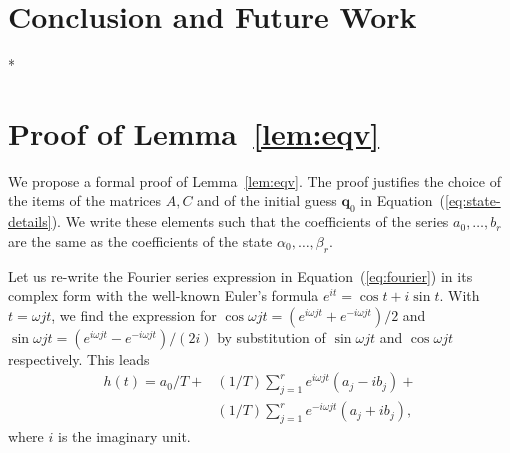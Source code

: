 \documentclass[letterpaper,10pt,conference]{ieeeconf}
\newcommand{\figpath}{./figures}
\theoremstyle{definition}
\begin{document}
%  

%  


\section{Conclusion and Future Work}
\label{sec:conclusion}

*


\balance

 

\leavevmode\thispagestyle{empty}\newpage
\nobalance

\appendices

\section{Proof of Lemma~\ref{lem:eqv}}
\label{app:proof-eqv}

We propose a formal proof of Lemma~\ref{lem:eqv}. The proof justifies the choice of the items of the matrices $A,C$ and of the initial guess $\mathbf{q}_0$ in Equation~(\ref{eq:state-details}). We write these elements such that the coefficients of the series $a_0,\dots,b_r$ are the same as the coefficients of the state $\alpha_0,\dots,\beta_r$.

Let us re-write the Fourier series expression in Equation~(\ref{eq:fourier}) in its complex form with the well-known Euler's formula $e^{it}=\cos{t}+i\sin{t}$. With $t=\omega jt$, we find the expression for $\cos{\omega jt}=(e^{i\omega jt}+e^{-i\omega jt})/2$ and $\sin{\omega jt}=(e^{i\omega jt}-e^{-i\omega jt})/(2i)$ by substitution of $\sin{\omega jt}$ and $\cos{\omega jt}$ respectively. This leads~\cite{kuo1967automatic}
\begin{equation}\begin{split}\label{eq:proof-complex}
  h(t)=a_0/T+&(1/T)\sum_{j=1}^{r}{e^{i\omega jt}(a_j-ib_j)}+\\&(1/T)\sum_{j=1}^{r}{e^{-i\omega jt}(a_j+ib_j)},
 \end{split}\end{equation}
where $i$ is the imaginary unit. 
\end{document}
